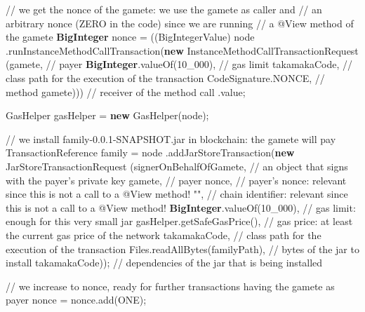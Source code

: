 \documentclass[a4paper,]{book}
\newenvironment{Shaded}{\begin{snugshade}}{\end{snugshade}}
\newcommand{\BuiltInTok}[1]{\textcolor[rgb]{0.39,0.29,0.61}{\textbf{#1}}}
\newcommand{\CommentTok}[1]{\textcolor[rgb]{0.54,0.53,0.53}{#1}}
\newcommand{\DecValTok}[1]{\textcolor[rgb]{0.69,0.50,0.00}{#1}}
\newcommand{\FunctionTok}[1]{\textcolor[rgb]{0.39,0.29,0.61}{#1}}
\newcommand{\KeywordTok}[1]{\textcolor[rgb]{0.12,0.11,0.11}{\textbf{#1}}}
\newcommand{\NormalTok}[1]{\textcolor[rgb]{0.12,0.11,0.11}{#1}}
\newcommand{\StringTok}[1]{\textcolor[rgb]{0.75,0.01,0.01}{#1}}
\renewenvironment{Shaded}{\begin{snugshade}\small}{\end{snugshade}}
\begin{document}
{\begin{Shaded}
\begin{Highlighting}[]
      \CommentTok{// we get the nonce of the gamete: we use the gamete as caller and}
      \CommentTok{// an arbitrary nonce (ZERO in the code) since we are running}
      \CommentTok{// a @View method of the gamete}
      \BuiltInTok{BigInteger}\NormalTok{ nonce = ((BigIntegerValue) node}
\NormalTok{        .}\FunctionTok{runInstanceMethodCallTransaction}\NormalTok{(}\KeywordTok{new}\NormalTok{ InstanceMethodCallTransactionRequest}
\NormalTok{          (gamete, }\CommentTok{// payer}
          \BuiltInTok{BigInteger}\NormalTok{.}\FunctionTok{valueOf}\NormalTok{(}\DecValTok{10_000}\NormalTok{), }\CommentTok{// gas limit}
\NormalTok{          takamakaCode, }\CommentTok{// class path for the execution of the transaction}
\NormalTok{          CodeSignature.}\FunctionTok{NONCE}\NormalTok{, }\CommentTok{// method}
\NormalTok{          gamete))) }\CommentTok{// receiver of the method call}
\NormalTok{        .}\FunctionTok{value}\NormalTok{;}

\NormalTok{      GasHelper gasHelper = }\KeywordTok{new} \FunctionTok{GasHelper}\NormalTok{(node);}

      \CommentTok{// we install family-0.0.1-SNAPSHOT.jar in blockchain: the gamete will pay}
\NormalTok{      TransactionReference family = node}
\NormalTok{        .}\FunctionTok{addJarStoreTransaction}\NormalTok{(}\KeywordTok{new}\NormalTok{ JarStoreTransactionRequest}
\NormalTok{          (signerOnBehalfOfGamete, }\CommentTok{// an object that signs with the payer's private key}
\NormalTok{          gamete, }\CommentTok{// payer}
\NormalTok{          nonce, }\CommentTok{// payer's nonce: relevant since this is not a call to a @View method!}
          \StringTok{""}\NormalTok{, }\CommentTok{// chain identifier: relevant since this is not a call to a @View method!}
          \BuiltInTok{BigInteger}\NormalTok{.}\FunctionTok{valueOf}\NormalTok{(}\DecValTok{10_000}\NormalTok{), }\CommentTok{// gas limit: enough for this very small jar}
\NormalTok{          gasHelper.}\FunctionTok{getSafeGasPrice}\NormalTok{(), }\CommentTok{// gas price: at least the current gas price of the network}
\NormalTok{          takamakaCode, }\CommentTok{// class path for the execution of the transaction}
\NormalTok{          Files.}\FunctionTok{readAllBytes}\NormalTok{(familyPath), }\CommentTok{// bytes of the jar to install}
\NormalTok{          takamakaCode)); }\CommentTok{// dependencies of the jar that is being installed}

      \CommentTok{// we increase to nonce, ready for further transactions having the gamete as payer}
\NormalTok{      nonce = nonce.}\FunctionTok{add}\NormalTok{(ONE);}


\end{Highlighting}
\end{Shaded}}
\end{document}
